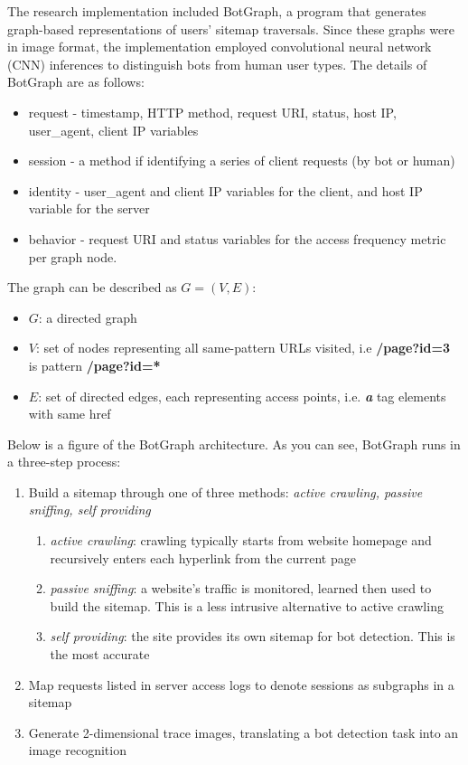 The research implementation included BotGraph, a program that generates graph-based representations of users' sitemap traversals.
Since these graphs were in image format, the implementation employed convolutional neural network (CNN) inferences to distinguish bots from human user types.
The details of BotGraph are as follows:
\begin{itemize}
    \item request - timestamp, HTTP method, request URI, status, host IP, user{\_}agent, client IP variables
    \item session - a method if identifying a series of client requests (by bot or human)
    \item identity - user{\_}agent and client IP variables for the client, and host IP variable for the server
    \item behavior - request URI and status variables for the access frequency metric per graph node.
\end{itemize}
The graph can be described as $G = (V, E)$:
\begin{itemize}
    \item $G$: a directed graph
    \item $V$: set of nodes representing all same-pattern URLs visited, i.e \textbf{/page?id=3} is pattern \textbf{/page?id=*}
    \item $E$: set of directed edges, each representing access points, i.e. \textbf{\textit{a}} tag elements with same href
\end{itemize}
Below is a figure of the BotGraph architecture. As you can see, BotGraph runs in a three-step process:
\begin{enumerate}
    \item Build a sitemap through one of three methods: \textit{active crawling, passive sniffing, self providing}
    \begin {enumerate}
        \item \textit{active crawling}: crawling typically starts from website homepage and recursively enters each hyperlink from the current page
        \item \textit{passive sniffing}: a website’s traffic is monitored, learned then used to build the sitemap. This is a less intrusive alternative to active crawling
        \item \textit{self providing}: the site provides its own sitemap for bot detection. This is the most accurate
    \end{enumerate}
    \item Map requests listed in server access logs to denote sessions as subgraphs in a sitemap
    \item Generate 2-dimensional trace images, translating a bot detection task into an image recognition
\end{enumerate}
